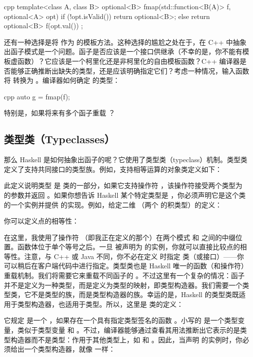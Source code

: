 \begin{snip}{cpp}
  template<class A, class B>
  optional<B> fmap(std::function<B(A)> f, optional<A> opt) {
    if (!opt.isValid())
    return optional<B>{};
    else
    return optional<B>{ f(opt.val()) };
  }
\end{snip}
还有一种选择是将  作为  的模板方法。这种选择的尴尬之处在于，在 C++ 中抽象出函子模式是一个问题。函子是否应该是一个接口供继承（不幸的是，你不能有模板虚函数）？它应该是一个柯里化还是非柯里化的自由模板函数？C++ 编译器是否能够正确推断出缺失的类型，还是应该明确指定它们？考虑一种情况，输入函数  将  转换为 。编译器如何确定  的类型：

\begin{snip}{cpp}
  auto g = fmap(f);
\end{snip}
特别是，如果将来有多个函子重载 ？

\subsection{类型类（Typeclasses）}

那么 Haskell 是如何抽象出函子的呢？它使用了类型类（typeclass）机制。类型类定义了支持共同接口的类型族。例如，支持相等运算的对象类定义如下：

此定义说明类型  是  类的一部分，如果它支持操作符 \code{(==)}，该操作符接受两个类型为  的参数并返回 。如果你想告诉 Haskell 某个特定类型是 ，你必须声明它是这个类的一个实例并提供 \code{(==)} 的实现。例如，给定二维 （两个  的积类型）的定义：

你可以定义点的相等性：

在这里，我使用了操作符 \code{(==)}（即我正在定义的那个）在两个模式  和  之间的中缀位置。函数体位于单个等号之后。一旦  被声明为  的实例，你就可以直接比较点的相等性。注意，与 C++ 或 Java 不同，你不必在定义  时指定  类（或接口）——你可以稍后在客户端代码中进行指定。类型类也是 Haskell 唯一的函数（和操作符）重载机制。我们将需要它来重载不同函子的 。不过这里有一个复杂的情况：函子并不是定义为一种类型，而是定义为类型的映射，即类型构造器。我们需要一个类型类，它不是类型的族，而是类型构造器的族。幸运的是，Haskell 的类型类既适用于类型构造器，也适用于类型。所以，这里是  类的定义：

它规定  是一个 ，如果存在一个具有指定类型签名的函数 。小写的  是一个类型变量，类似于类型变量  和 。不过，编译器能够通过查看其用法推断出它表示的是类型构造器而不是类型：作用于其他类型上，如  和 。因此，当声明  的实例时，你必须给出一个类型构造器，就像  一样：

